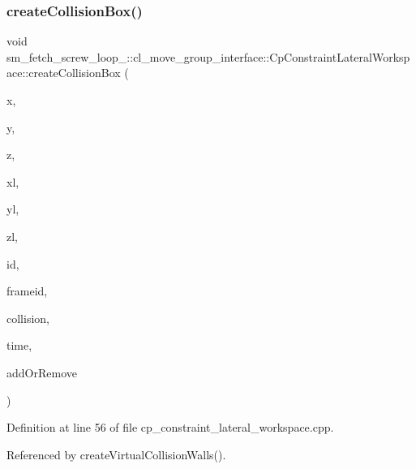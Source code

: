 \subsubsection{\texorpdfstring{create\+Collision\+Box()}{createCollisionBox()}}
{\footnotesize\ttfamily void sm\+\_\+fetch\+\_\+screw\+\_\+loop\+\_\+::cl\+\_\+move\+\_\+group\+\_\+interface\+::\+Cp\+Constraint\+Lateral\+Workspace\+::create\+Collision\+Box (\begin{DoxyParamCaption}\item[{float}]{x,  }\item[{float}]{y,  }\item[{float}]{z,  }\item[{float}]{xl,  }\item[{float}]{yl,  }\item[{float}]{zl,  }\item[{std\+::string}]{id,  }\item[{std\+::string}]{frameid,  }\item[{moveit\+\_\+msgs\+::\+Collision\+Object \&}]{collision,  }\item[{const ros\+::\+Time \&}]{time,  }\item[{int}]{add\+Or\+Remove }\end{DoxyParamCaption})}



Definition at line 56 of file cp\+\_\+constraint\+\_\+lateral\+\_\+workspace.\+cpp.



Referenced by create\+Virtual\+Collision\+Walls().


